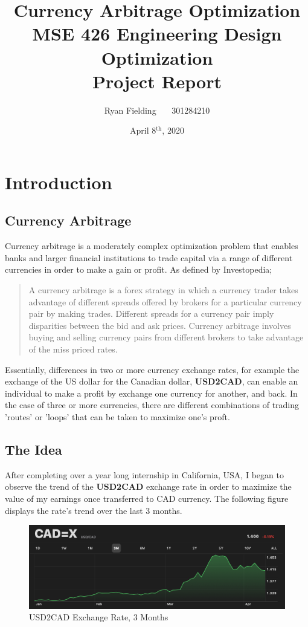 \documentclass[12pt]{article}
\author{Ryan Fielding \ \ \ 301284210}
\title{\textbf{Currency Arbitrage Optimization\\}
\bigskip
\bigskip
MSE 426 Engineering Design Optimization\\Project Report
}
\date{April 8$^{\text{th}}$, 2020}
\begin{document}
\maketitle
\newpage
\tableofcontents
\newpage
\listoffigures
\listoftables
\newpage

\section{Introduction}
\subsection{Currency Arbitrage}
Currency arbitrage is a moderately complex optimization problem that enables banks and larger financial institutions to trade capital via a range of different currencies in order to make a gain or profit. As defined by Investopedia;
\begin{quote}
A currency arbitrage is a forex strategy in which a currency trader takes advantage of different spreads offered by brokers for a particular currency pair by making trades. Different spreads for a currency pair imply disparities between the bid and ask prices. Currency arbitrage involves buying and selling currency pairs from different brokers to take advantage of the miss priced rates. \cite{invest}
\end{quote}
Essentially, differences in two or more currency exchange rates, for example the exchange of the US dollar for the Canadian dollar, \textbf{USD2CAD}, can enable an individual to make a profit by exchange one currency for another, and back. In the case of three or more currencies, there are different combinations of trading 'routes' or 'loops' that can be taken to maximize one's proft.
\subsection{The Idea}
After completing over a year long internship in California, USA, I began to observe the trend of the \textbf{USD2CAD} exchange rate in order to maximize the value of my earnings once transferred to CAD currency. The following figure displays the rate's trend over the last 3 months.

\begin{figure}[H]
    \centering
    \includegraphics[width=.9\linewidth]{figures/rate}
    \caption{USD2CAD Exchange Rate, 3 Months \cite{rate}}
    \label{fig:rate}
\end{figure}
\end{document}
